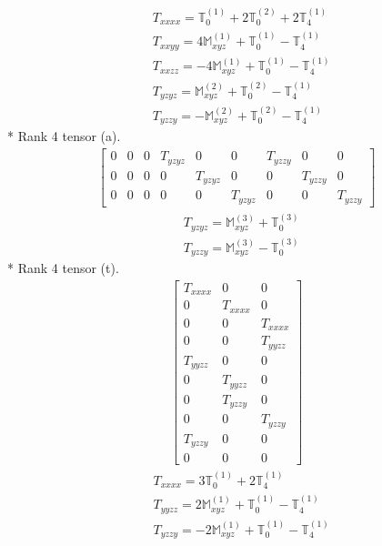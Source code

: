 \documentclass[fleqn,8pt,landscape]{jsarticle}
\begin{document}
\begin{align*}
& T_{xxxx} = \mathbb{T}_{0}^{(1)} + 2 \mathbb{T}_{0}^{(2)} + 2 \mathbb{T}_{4}^{(1)} \\
& T_{xxyy} = 4 \mathbb{M}_{xyz}^{(1)} + \mathbb{T}_{0}^{(1)} - \mathbb{T}_{4}^{(1)} \\
& T_{xxzz} = - 4 \mathbb{M}_{xyz}^{(1)} + \mathbb{T}_{0}^{(1)} - \mathbb{T}_{4}^{(1)} \\
& T_{yzyz} = \mathbb{M}_{xyz}^{(2)} + \mathbb{T}_{0}^{(2)} - \mathbb{T}_{4}^{(1)} \\
& T_{yzzy} = - \mathbb{M}_{xyz}^{(2)} + \mathbb{T}_{0}^{(2)} - \mathbb{T}_{4}^{(1)}
\end{align*}
* Rank 4 tensor (a).
\begin{align*}
\begin{bmatrix} 0 & 0 & 0 & T_{yzyz} & 0 & 0 & T_{yzzy} & 0 & 0 \\ 0 & 0 & 0 & 0 & T_{yzyz} & 0 & 0 & T_{yzzy} & 0 \\ 0 & 0 & 0 & 0 & 0 & T_{yzyz} & 0 & 0 & T_{yzzy} \end{bmatrix}
\end{align*}
\begin{align*}
& T_{yzyz} = \mathbb{M}_{xyz}^{(3)} + \mathbb{T}_{0}^{(3)} \\
& T_{yzzy} = \mathbb{M}_{xyz}^{(3)} - \mathbb{T}_{0}^{(3)}
\end{align*}
* Rank 4 tensor (t).
\begin{align*}
\begin{bmatrix} T_{xxxx} & 0 & 0 \\ 0 & T_{xxxx} & 0 \\ 0 & 0 & T_{xxxx} \\ 0 & 0 & T_{yyzz} \\ T_{yyzz} & 0 & 0 \\ 0 & T_{yyzz} & 0 \\ 0 & T_{yzzy} & 0 \\ 0 & 0 & T_{yzzy} \\ T_{yzzy} & 0 & 0 \\ 0 & 0 & 0 \end{bmatrix}
\end{align*}
\begin{align*}
& T_{xxxx} = 3 \mathbb{T}_{0}^{(1)} + 2 \mathbb{T}_{4}^{(1)} \\
& T_{yyzz} = 2 \mathbb{M}_{xyz}^{(1)} + \mathbb{T}_{0}^{(1)} - \mathbb{T}_{4}^{(1)} \\
& T_{yzzy} = - 2 \mathbb{M}_{xyz}^{(1)} + \mathbb{T}_{0}^{(1)} - \mathbb{T}_{4}^{(1)}
\end{align*}
\end{document}
